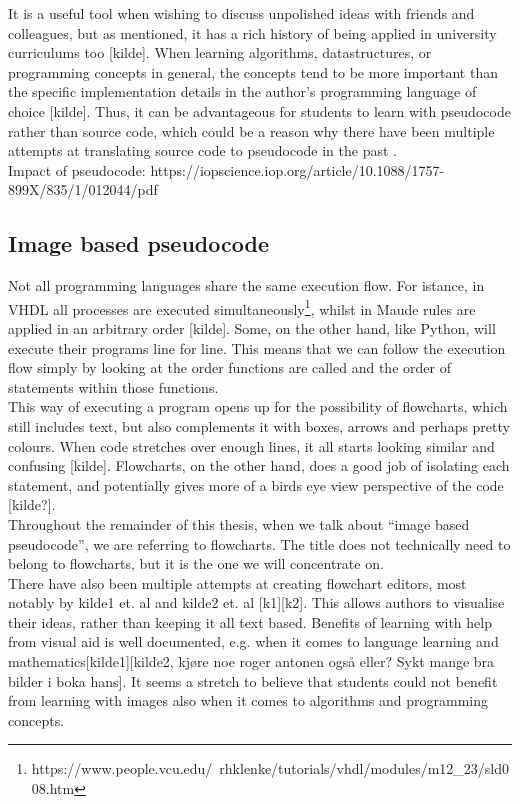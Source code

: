 It is a useful tool when wishing to discuss unpolished ideas with friends and colleagues, but as mentioned, it has a rich history of being applied in university curriculums too [kilde]. When learning algorithms, datastructures, or programming concepts in general, the concepts tend to be more important than the specific implementation details in the author’s programming language of choice [kilde]. Thus, it can be advantageous for students to learn with pseudocode rather than source code, which could be a reason why there have been multiple attempts at translating source code to pseudocode in the past \cite{PSEU:/Kreher/Stinson}\cite{DBLP:conf/kbse/OdaFNHSTN15}\cite{DBLP:conf/aswec/AlhefdhiDHG18}. \hfill \\

Impact of pseudocode: https://iopscience.iop.org/article/10.1088/1757-899X/835/1/012044/pdf

\subsection{Image based pseudocode}

Not all programming languages share the same execution flow. For istance, in VHDL all processes are executed simultaneously\footnote{https://www.people.vcu.edu/~rhklenke/tutorials/vhdl/modules/m12\_23/sld008.htm}, whilst in Maude rules are applied in an arbitrary order [kilde]. Some, on the other hand, like Python, will execute their programs line for line. This means that we can follow the execution flow simply by looking at the order functions are called and the order of statements within those functions. \hfill \\

This way of executing a program opens up for the possibility of flowcharts, which still includes text, but also complements it with boxes, arrows and perhaps pretty colours. When code stretches over enough lines, it all starts looking similar and confusing [kilde]. Flowcharts, on the other hand, does a good job of isolating each statement, and potentially gives more of a birds eye view perspective of the code [kilde?]. \hfill \\

Throughout the remainder of this thesis, when we talk about ``image based pseudocode'', we are referring to flowcharts. The title does not technically need to belong to flowcharts, but it is the one we will concentrate on. \hfill \\

There have also been multiple attempts at creating flowchart editors, most notably by kilde1 et. al and kilde2 et. al [k1][k2]. This allows authors to visualise their ideas, rather than keeping it all text based. Benefits of learning with help from visual aid is well documented, e.g. when it comes to language learning and mathematics[kilde1][kilde2, kjøre noe roger antonen også eller? Sykt mange bra bilder i boka hans]. It seems a stretch to believe that students could not benefit from learning with images also when it comes to algorithms and programming concepts. \hfill \\


